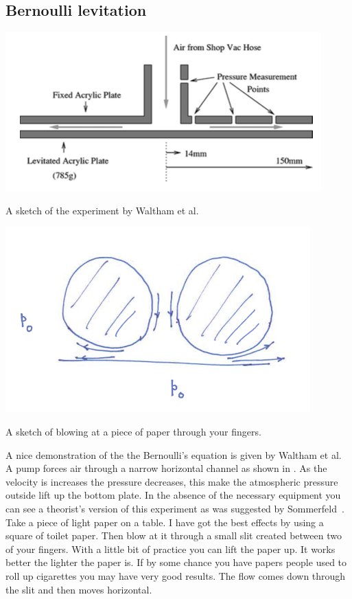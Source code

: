 \subsection{Bernoulli levitation}
\begin{marginfigure}
\includegraphics{figures/BernoulliLevitation.png}
\caption{A sketch of the experiment by Waltham et al.}
\label{fig:waltham}
\end{marginfigure}
\begin{marginfigure}
\includegraphics{figures/SommFingers.png}
\caption{A sketch of blowing at a piece of paper through your fingers. }
\label{fig:SommFinger}
\end{marginfigure}
A nice demonstration of the the Bernoulli's equation is given by Waltham et al\cite{waltham2003bernoulli}.
A pump forces air through a narrow horizontal channel as shown in . As the velocity
is increases the pressure decreases, this make the atmospheric pressure outside lift up the bottom plate. 
In the absence of the necessary equipment you can see a theorist's version of this experiment 
as was suggested by Sommerfeld~\cite{SomII}. Take a piece of light paper on a table. I have got the best effects
by using a square of toilet paper. Then blow at it through a small slit created between two of
your fingers. With a little bit of practice you can lift the paper up. It works better the lighter the
paper is.  If by some chance you have papers people used to roll up cigarettes you may have very good results. 
The flow comes down through the slit and then moves horizontal. 
